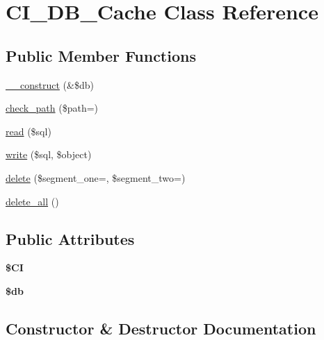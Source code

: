 \hypertarget{class_c_i___d_b___cache}{}\section{C\+I\+\_\+\+D\+B\+\_\+\+Cache Class Reference}
\label{class_c_i___d_b___cache}
\subsection*{Public Member Functions}
\begin{DoxyCompactItemize}
\item 
\mbox{\hyperlink{class_c_i___d_b___cache_ad3768a40a7e3cdb23bebfc5ae1776b70}{\+\_\+\+\_\+construct}} (\&\$db)
\item 
\mbox{\hyperlink{class_c_i___d_b___cache_afd3a5177d51d87c81d8fd830b05fa3fb}{check\+\_\+path}} (\$path=\textquotesingle{}\textquotesingle{})
\item 
\mbox{\hyperlink{class_c_i___d_b___cache_a2b4aca98bf9b1789d44d86717663c242}{read}} (\$sql)
\item 
\mbox{\hyperlink{class_c_i___d_b___cache_aba7bfc980978c9d0396b01cc7a9a992c}{write}} (\$sql, \$object)
\item 
\mbox{\hyperlink{class_c_i___d_b___cache_a124770c2acc57cedb613d6ac9d2d929e}{delete}} (\$segment\+\_\+one=\textquotesingle{}\textquotesingle{}, \$segment\+\_\+two=\textquotesingle{}\textquotesingle{})
\item 
\mbox{\hyperlink{class_c_i___d_b___cache_a0546cd5b6ae0580b79e46c03d5910740}{delete\+\_\+all}} ()
\end{DoxyCompactItemize}
\subsection*{Public Attributes}
\begin{DoxyCompactItemize}
\item 
\mbox{\label{class_c_i___d_b___cache_af2abf23d51799ac14705f6b3ebea057e}} 
{\bfseries \$\+CI}
\item 
\mbox{\label{class_c_i___d_b___cache_a180f166a8e1e9368ebf5f882924ca2a8}} 
{\bfseries \$db}
\end{DoxyCompactItemize}


\subsection{Constructor \& Destructor Documentation}
\mbox{\label{class_c_i___d_b___cache_ad3768a40a7e3cdb23bebfc5ae1776b70}} 
